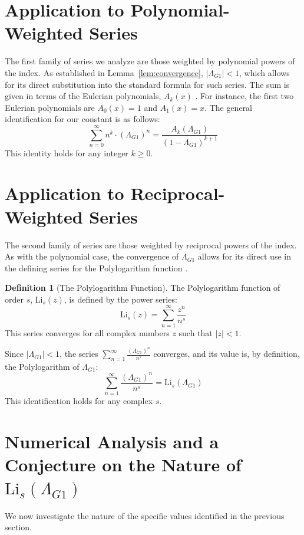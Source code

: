 \documentclass{amsart}
\theoremstyle{plain}
\theoremstyle{definition}
\newtheorem{definition}[theorem]{Definition}
\theoremstyle{remark}
\newcommand{\LambdaG}{\Lambda_{G1}}
\begin{document}
\section{Application to Polynomial-Weighted Series}
The first family of series we analyze are those weighted by polynomial powers of the index. As established in Lemma~\ref{lem:convergence}, $|\LambdaG|<1$, which allows for its direct substitution into the standard formula for such series. The sum is given in terms of the Eulerian polynomials, $A_k(x)$ \cite{AandS}. For instance, the first two Eulerian polynomials are $A_0(x)=1$ and $A_1(x)=x$. The general identification for our constant is as follows:
$$ \sum_{n=0}^{\infty} n^k \cdot (\LambdaG)^n = \frac{A_k(\LambdaG)}{(1-\LambdaG)^{k+1}} $$
This identity holds for any integer $k \ge 0$.

\section{Application to Reciprocal-Weighted Series}
The second family of series are those weighted by reciprocal powers of the index. As with the polynomial case, the convergence of $\LambdaG$ allows for its direct use in the defining series for the Polylogarithm function \cite{Lewin}.

\begin{definition}[The Polylogarithm Function]
The Polylogarithm function of order $s$, $\mathrm{Li}_s(z)$, is defined by the power series:
$$ \mathrm{Li}_s(z) = \sum_{n=1}^{\infty} \frac{z^n}{n^s} $$
This series converges for all complex numbers $z$ such that $|z|<1$.
\end{definition}

Since $|\LambdaG| < 1$, the series $\sum_{n=1}^{\infty} \frac{(\LambdaG)^{n}}{n^s}$ converges, and its value is, by definition, the Polylogarithm of $\LambdaG$:
$$ \sum_{n=1}^{\infty} \frac{(\LambdaG)^{n}}{n^s} = \mathrm{Li}_s(\LambdaG) $$
This identification holds for any complex $s$.

\section{Numerical Analysis and a Conjecture on the Nature of \texorpdfstring{$\mathrm{Li}_s(\LambdaG)$}{Li\_s(Lambda\_G1)}}
We now investigate the nature of the specific values identified in the previous section.
\end{document}
